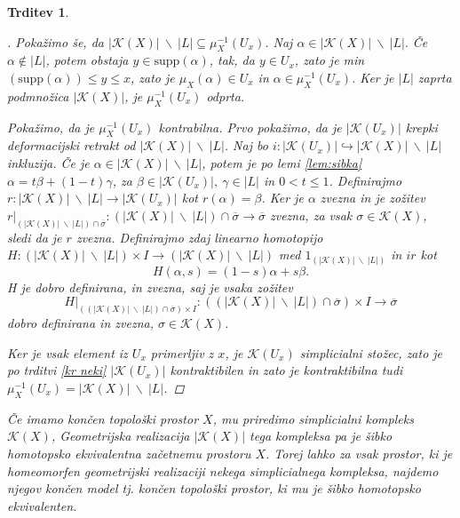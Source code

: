 \documentclass[a4paper,12pt]{article}
\DeclareRobustCommand{\k}{
    \mathcal{K}
}
\theoremstyle{definition}
\theoremstyle{plain}
\theoremstyle{definition}
\theoremstyle{plain}
\newtheorem{trditev}{Trditev}
\theoremstyle{plain}
\theoremstyle{plain}
\theoremstyle{plain}
\newenvironment{dokaz}{\begin{proof}[\bfseries\upshape\proofname]}{\end{proof}}
\begin{document}
\begin{trditev}
\begin{dokaz}
    Pokažimo še, da $|\mathcal{K}(X)|\ \backslash \
    |L|\subseteq \mu_X^{-1}(U_x)$. Naj $\alpha \in |\mathcal{K}(X)|\ \backslash \ |L|.$
    Če  $\alpha \notin |L|$, potem obstaja $y\in 
    \text{supp}(\alpha)$, tak, da $y \in U_x$, zato je 
    min$(\text{supp}(\alpha))\leq y \leq x$, zato je 
    $\mu_X(\alpha) \in U_x$ in $\alpha \in \mu_X^{-1}
    (U_x)$.
    Ker je $|L|$ zaprta podmnožica $|\mathcal{K}(X)|$, je 
    $\mu_X^{-1}(U_x)$ odprta.

    Pokažimo, da je $\mu_X^{-1}(U_x)$ kontrabilna. Prvo pokažimo, da je 
    $|\mathcal{K}(U_x)|$ krepki deformacijski retrakt 
    od $|\mathcal{K}(X)|\ \backslash \ |L|$. Naj bo $i:|\k(U_x)|\hookrightarrow |\mathcal{K}
    (X)|\ \backslash \ |L|$ inkluzija. Če je $\alpha \in |\mathcal{K}(X)|\ 
    \backslash \ |L|$, potem je po lemi \ref{lem:sibka}  $\alpha = t\beta + 
    (1-t)\gamma$, za $\beta \in |\k(U_x)|, \ \gamma \in |L|$ in $0<t\leq 1$. 
    Definirajmo $r:|\mathcal{K}(X)|\ \backslash \ |L|\rightarrow |\k(U_x)|$ 
    kot $r(\alpha)=\beta$. Ker je $\alpha$ zvezna in je zožitev $r|_{(|\mathcal{K}(X)|\ \backslash \ |L|)\cap 
    \overline{\sigma}}:(|\mathcal{K}(X)|\ \backslash \ |L|)\cap 
    \overline{\sigma} \rightarrow \overline{\sigma}$ zvezna, za vsak 
    $\sigma \in \k(X)$, sledi da je $r$ zvezna. Definirajmo zdaj linearno homotopijo $H:(|\mathcal{K}(X)|\ \backslash \ |L|) \times I \rightarrow (|\mathcal{K}(X)|\ \backslash \ |L|)$ med $1_{(|\mathcal{K}(X)|\ \backslash \ |L|)}$ in $ir$ kot 
    $$
    H(\alpha,s)=(1-s)\alpha + s\beta.
    $$
    H je dobro definirana, in zvezna, saj je vsaka zožitev 
    $$
    H|_{((|\mathcal{K}(X)|\ \backslash \ |L|)\cap 
    \overline{\sigma})\times I}:((|\mathcal{K}(X)|\ \backslash \ |L|)\cap 
    \overline{\sigma})\times I \rightarrow \overline{\sigma}
    $$
    dobro definirana in zvezna, $\sigma \in \k(X)$.

    Ker je vsak element iz $U_x$ primerljiv z $x$, je $\k(U_x)$ 
    simplicialni stožec, zato je po trditvi \ref{kr neki} $|\k(U_x)|$ 
    kontraktibilen in zato je kontraktibilna tudi $\mu_X^{-1}
    (U_x)=|\mathcal{K}(X)|\ \backslash \ |L|$.
\end{dokaz}


Če imamo končen topološki prostor $X$, mu priredimo simplicialni kompleks
$\k(X)$, Geometrijska realizacija $|\k(X)|$ tega kompleksa pa je šibko homotopsko ekvivalentna 
začetnemu prostoru $X$. Torej lahko za vsak prostor, ki je homeomorfen geometrijski realizaciji
nekega simplicialnega kompleksa, najdemo njegov končen model tj. končen topološki prostor, ki mu
je šibko homotopsko ekvivalenten.


\end{trditev}
\end{document}
